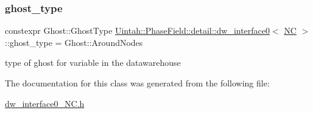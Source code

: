 \subsubsection{\texorpdfstring{ghost\+\_\+type}{ghost\_type}}
{\footnotesize\ttfamily constexpr Ghost\+::\+Ghost\+Type \hyperlink{classUintah_1_1PhaseField_1_1detail_1_1dw__interface0}{Uintah\+::\+Phase\+Field\+::detail\+::dw\+\_\+interface0}$<$ \hyperlink{namespaceUintah_1_1PhaseField_a33d355affda78a83f45755ba8388cedda77924170fe82bfd58b74ca3e44139718}{NC} $>$\+::ghost\+\_\+type = Ghost\+::\+Around\+Nodes\hspace{0.3cm}{\ttfamily [static]}}



type of ghost for variable in the datawarehouse 



The documentation for this class was generated from the following file\+:\begin{DoxyCompactItemize}
\item 
\hyperlink{dw__interface0__NC_8h}{dw\+\_\+interface0\+\_\+\+N\+C.\+h}\end{DoxyCompactItemize}
